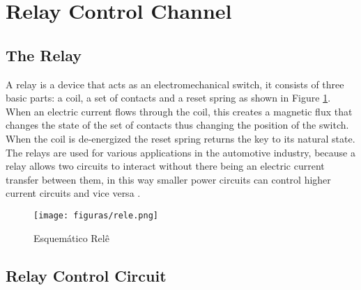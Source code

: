 \section{Relay Control Channel}
	
	\subsection{The Relay}
		A relay is a device that acts as an electromechanical switch, it consists of three basic parts: a coil, a set of contacts and a reset spring as shown in Figure \ref{fig-relay}. When an electric current flows through the coil, this creates a magnetic flux that changes the state of the set of contacts thus changing the position of the switch. When the coil is de-energized the reset spring returns the key to its natural state. The relays are used for various applications in the automotive industry, because a relay allows two circuits to interact without there being an electric current transfer between them, in this way smaller power circuits can control higher current circuits and vice versa \cite{keller1962relays} .

		\begin{figure}[htbp]
			\centering
				\texttt{[image: figuras/rele.png]}
			\caption{Esquemático Relê \cite{relay-scheme}}
			\label{fig-relay}
		\end{figure}
		
	\subsection{Relay Control Circuit}